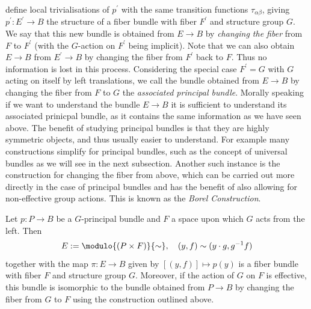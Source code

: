 define local trivialisations of $p^\prime$ with the same transition functions $\tau_{\alpha\beta}$, giving $p^\prime \colon E^\prime \to B$ the structure of a fiber bundle with fiber $F^\prime$ and structure group $G$. We say that this new bundle is obtained from $E \to B$ by \textit{changing the fiber} from $F$ to $F^\prime$ (with the $G$-action on $F^\prime$ being implicit). Note that we can also obtain $E \to B$ from $E^\prime \to B$ by changing the fiber from $F^\prime$ back to $F$. Thus no information is lost in this process. Considering the special case $F^\prime = G$ with $G$ acting on itself by left translations, we call the bundle obtained from $E \to B$ by changing the fiber from $F$ to $G$ the \textit{associated principal bundle}. Morally speaking if we want to understand the bundle $E \to B$ it is sufficient to understand its associated prinicpal bundle, as it contains the same information as we have seen above. The benefit of studying principal bundles is that they are highly symmetric objects, and thus usually easier to understand. For example many constructions simplify for principal bundles, such as the concept of universal bundles as we will see in the next subsection. Another such instance is the construction for changing the fiber from above, which can be carried out more directly in the case of principal bundles and has the benefit of also allowing for non-effective group actions. This is known as the \textit{Borel Construction}.

\begin{lemma}
    \label{bundles:lem:borel_construction}
    Let $p \colon P \to B$ be a $G$-principal bundle and $F$ a space upon which $G$ acts from the left. Then 
    \[
    E := \modulo{(P \times F)}{\sim}, \quad (y,f) \sim (y\cdot g, g^{-1}f)
    \]
    together with the map $\pi \colon E \to B$ given by $[(y,f)] \mapsto p(y)$ is a fiber bundle with fiber $F$ and structure group $G$. Moreover, if the action of $G$ on $F$ is effective, this bundle is isomorphic to the bundle obtained from $P \to B$ by changing the fiber from $G$ to $F$ using the construction outlined above.
\end{lemma}

